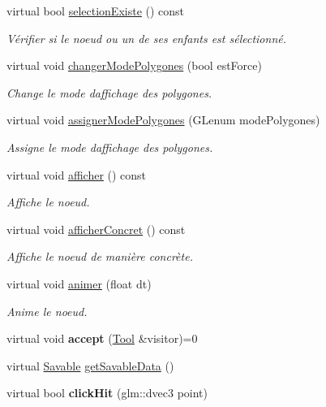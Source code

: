 \begin{DoxyCompactItemize}
virtual bool \hyperlink{group__inf2990_gae7c702b865babd20ddd30dd776adc82b}{selection\+Existe} () const 
\begin{DoxyCompactList}\small\item\em Vérifier si le noeud ou un de ses enfants est sélectionné. \end{DoxyCompactList}\item 
virtual void \hyperlink{group__inf2990_ga13a97383c2081b405fc2e0d97cff80df}{changer\+Mode\+Polygones} (bool est\+Force)
\begin{DoxyCompactList}\small\item\em Change le mode d\textquotesingle{}affichage des polygones. \end{DoxyCompactList}\item 
virtual void \hyperlink{group__inf2990_ga726d9d0a524939f405aeeac3fbd06666}{assigner\+Mode\+Polygones} (G\+Lenum mode\+Polygones)
\begin{DoxyCompactList}\small\item\em Assigne le mode d\textquotesingle{}affichage des polygones. \end{DoxyCompactList}\item 
virtual void \hyperlink{group__inf2990_gae789271ea41032d717b8e4300be05de0}{afficher} () const 
\begin{DoxyCompactList}\small\item\em Affiche le noeud. \end{DoxyCompactList}\item 
virtual void \hyperlink{group__inf2990_ga330df455c8b08440d3c8e64d0a480391}{afficher\+Concret} () const 
\begin{DoxyCompactList}\small\item\em Affiche le noeud de manière concrète. \end{DoxyCompactList}\item 
virtual void \hyperlink{group__inf2990_gadc6ebe69894dbb682fdd0ecb1b6c11e9}{animer} (float dt)
\begin{DoxyCompactList}\small\item\em Anime le noeud. \end{DoxyCompactList}\item 
\hypertarget{class_noeud_abstrait_ac166d3266931e3bb81d4df1617108340}{}virtual void {\bfseries accept} (\hyperlink{class_tool}{Tool} \&visitor)=0\label{class_noeud_abstrait_ac166d3266931e3bb81d4df1617108340}

\item 
virtual \hyperlink{class_savable}{Savable} \hyperlink{group__inf2990_ga1729231ec41b3ba4d6668eba101ead44}{get\+Savable\+Data} ()
\item 
\hypertarget{group__inf2990_gaa43f307d42d6dd8890cdce48c5c53128}{}virtual bool {\bfseries click\+Hit} (glm\+::dvec3 point)\label{group__inf2990_gaa43f307d42d6dd8890cdce48c5c53128}


\end{DoxyCompactItemize}
